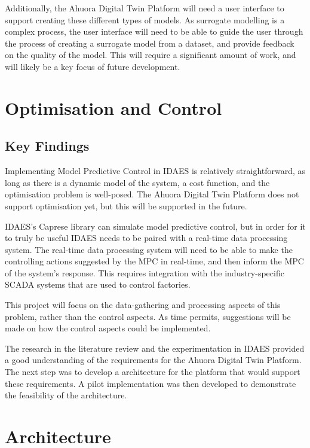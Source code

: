 \documentclass[12pt]{report}
\begin{document}
Additionally, the Ahuora Digital Twin Platform will need a user interface to support creating these different types of models. As surrogate modelling is a complex process, the user interface will need to be able to guide the user through the process of creating a surrogate model from a dataset, and provide feedback on the quality of the model. This will require a significant amount of work, and will likely be a key focus of future development.


\section{Optimisation and Control}


\subsection{Key Findings}

Implementing Model Predictive Control in IDAES is relatively straightforward, as long as there is a dynamic model of the system, a cost function, and the optimisation problem is well-posed. The Ahuora Digital Twin Platform does not support optimisation yet, but this will be supported in the future.

IDAES's Caprese library can simulate model predictive control, but in order for it to truly be useful IDAES needs to be paired with a real-time data processing system. The real-time data processing system will need to be able to make the controlling actions suggested by the MPC in real-time, and then inform the MPC of the system's response. This requires integration with the industry-specific SCADA systems that are used to control factories.

This project will focus on the data-gathering and processing aspects of this problem, rather than the control aspects. As time permits, suggestions will be made on how the control aspects could be implemented.



The research in the literature review and the experimentation in IDAES provided a good understanding of the requirements for the Ahuora Digital Twin Platform. The next step was to develop a architecture for the platform that would support these requirements. A pilot implementation was then developed to demonstrate the feasibility of the architecture.

\section{Architecture}
\end{document}
